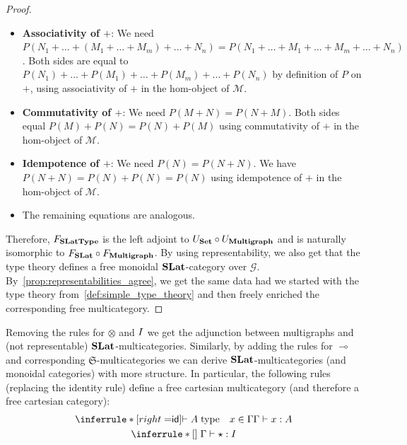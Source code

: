 \begin{proof}
\begin{itemize}
\begin{itemize}
  \item \textbf{Associativity of $+$}: We need
  $P(N_1 + \ldots + (M_1 + \ldots + M_m) + \ldots + N_n) =
  P(N_1 + \ldots + M_1 + \ldots + M_m + \ldots + N_n)$.
  Both sides are equal to $P(N_1) + \ldots + P(M_1) + \ldots + P(M_m) + \ldots +
  P(N_n)$ by definition of $P$ on $+$, using associativity of $+$ in the
  hom-object of $\mathcal{M}$.

  \item \textbf{Commutativity of $+$}: We need $P(M + N) = P(N + M)$.
  Both sides equal $P(M) + P(N) = P(N) + P(M)$ using commutativity of $+$ in
  the hom-object of $\mathcal{M}$.

  \item \textbf{Idempotence of $+$}: We need $P(N) = P(N + N)$.
  We have $P(N + N) = P(N) + P(N) = P(N)$ using idempotence of $+$ in the
  hom-object of $\mathcal{M}$.

  \item The remaining equations are analogous.
\end{itemize}
\end{itemize}
Therefore, $F_{\mathbf{SLatType}}$ is the left adjoint to $U_{\mathbf{Set}} \circ U_{\mathbf{Multigraph}}$ and is naturally isomorphic to $F_{\mathbf{SLat}} \circ F_{\mathbf{Multigraph}}$.
By using representability, we also get that the type theory defines a free monoidal $\mathbf{SLat}$-category over $\mathcal{G}$.
By~\autoref{prop:representabilities_agree}, we get the same data had we started with the type theory from~\autoref{def:simple_type_theory} and then freely enriched the corresponding free multicategory.
\end{proof}

\begin{remark}
  Removing the rules for $\otimes$ and $I$ we get the adjunction between multigraphs and (not representable) $\mathbf{SLat}$-multicategories.
  Similarly, by adding the rules for $\multimap$ and corresponding $\mathfrak{S}$-multicategories we can derive $\mathbf{SLat}$-multicategories (and monoidal categories) with more structure.
  In particular, the following rules (replacing the identity rule) define a free cartesian multicategory (and therefore a free cartesian category):
  \begin{gather*}
  \label{eq:cartesian_structure}
  \inferrule*[right=$\id$]{\vdash A\;\text{type} \quad x \in \Gamma}{\Gamma \vdash x : A}\\
  \inferrule*[]{\;}{\Gamma \vdash \star : \I}
  \end{gather*}
\end{remark}

